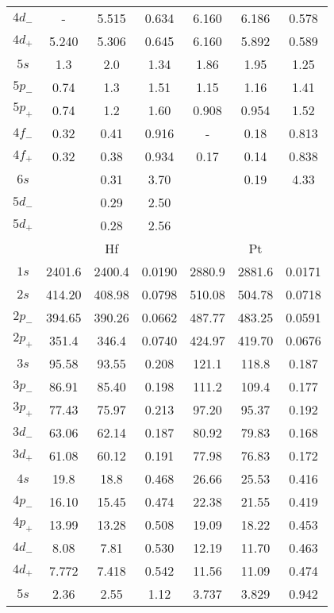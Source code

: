 \begin{longtable}{|c|ccc|ccc|}
$4d_-$ & -      & 5.515  & 0.634  & 6.160  & 6.186  & 0.578  \\
$4d_+$ & 5.240  & 5.306  & 0.645  & 6.160  & 5.892  & 0.589  \\
$5s$   & 1.3    & 2.0    & 1.34   & 1.86   & 1.95   & 1.25   \\
$5p_-$ & 0.74   & 1.3    & 1.51   & 1.15   & 1.16   & 1.41   \\
$5p_+$ & 0.74   & 1.2    & 1.60   & 0.908  & 0.954  & 1.52   \\
$4f_-$ & 0.32   & 0.41   & 0.916  & -      & 0.18   & 0.813  \\
$4f_+$ & 0.32   & 0.38   & 0.934  & 0.17   & 0.14   & 0.838  \\
$6s$   &        & 0.31   & 3.70   &        & 0.19   & 4.33  \\
$5d_-$ &        & 0.29   & 2.50   &        &        &      \\
$5d_+$ &        & 0.28   & 2.56   &        &        &     \\
\hline
& \multicolumn{3}{c}{Hf} & \multicolumn{3}{c}{Pt} \\
\hline
$1s$   & 2401.6 & 2400.4 & 0.0190 & 2880.9 & 2881.6 & 0.0171 \\
$2s$   & 414.20 & 408.98 & 0.0798 & 510.08 & 504.78 & 0.0718 \\
$2p_-$ & 394.65 & 390.26 & 0.0662 & 487.77 & 483.25 & 0.0591 \\
$2p_+$ & 351.4  & 346.4  & 0.0740 & 424.97 & 419.70 & 0.0676 \\
$3s$   & 95.58  & 93.55  & 0.208 & 121.1  & 118.8  & 0.187 \\
$3p_-$ & 86.91  & 85.40  & 0.198 & 111.2  & 109.4  & 0.177 \\
$3p_+$ & 77.43  & 75.97  & 0.213 & 97.20  & 95.37  & 0.192 \\
$3d_-$ & 63.06  & 62.14  & 0.187 & 80.92  & 79.83  & 0.168 \\
$3d_+$ & 61.08  & 60.12  & 0.191 & 77.98  & 76.83  & 0.172 \\
$4s$   & 19.8   & 18.8   & 0.468 & 26.66  & 25.53  & 0.416 \\
$4p_-$ & 16.10  & 15.45  & 0.474 & 22.38  & 21.55  & 0.419 \\
$4p_+$ & 13.99  & 13.28  & 0.508 & 19.09  & 18.22  & 0.453 \\
$4d_-$ & 8.08   & 7.81   & 0.530 & 12.19  & 11.70  & 0.463 \\
$4d_+$ & 7.772  & 7.418  & 0.542 & 11.56  & 11.09  & 0.474 \\
$5s$   & 2.36   & 2.55   & 1.12  & 3.737  & 3.829  & 0.942 \\

\end{longtable}
